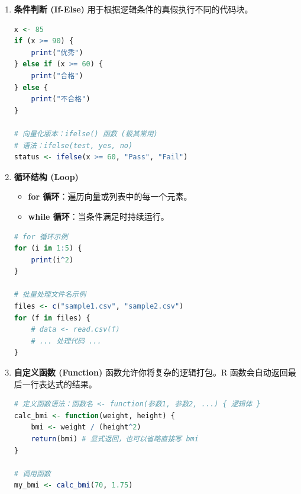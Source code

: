\begin{enumerate}[label=\arabic*., leftmargin=2em]
    \item \textbf{条件判断 (If-Else)}
    用于根据逻辑条件的真假执行不同的代码块。
\begin{lstlisting}[language=R]
x <- 85
if (x >= 90) {
    print("优秀")
} else if (x >= 60) {
    print("合格")
} else {
    print("不合格")
}

# 向量化版本：ifelse() 函数 (极其常用)
# 语法：ifelse(test, yes, no)
status <- ifelse(x >= 60, "Pass", "Fail")
\end{lstlisting}

    \item \textbf{循环结构 (Loop)}
    \begin{itemize}
        \item \textbf{for 循环}：遍历向量或列表中的每一个元素。
        \item \textbf{while 循环}：当条件满足时持续运行。
    \end{itemize}
\begin{lstlisting}[language=R]
# for 循环示例
for (i in 1:5) {
    print(i^2)
}

# 批量处理文件名示例
files <- c("sample1.csv", "sample2.csv")
for (f in files) {
    # data <- read.csv(f)
    # ... 处理代码 ...
}
\end{lstlisting}

    \item \textbf{自定义函数 (Function)}
    函数允许你将复杂的逻辑打包。R 函数会自动返回最后一行表达式的结果。
\begin{lstlisting}[language=R]
# 定义函数语法：函数名 <- function(参数1, 参数2, ...) { 逻辑体 }
calc_bmi <- function(weight, height) {
    bmi <- weight / (height^2)
    return(bmi) # 显式返回，也可以省略直接写 bmi
}

# 调用函数
my_bmi <- calc_bmi(70, 1.75)
\end{lstlisting}
\end{enumerate}



